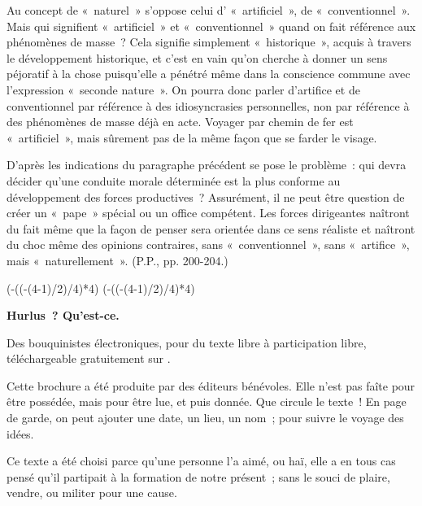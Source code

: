 \documentclass[french,twoside]{book} %
\newcommand{\dateline}[1]{\medskip{\RaggedLeft{#1}\par}\bigskip}
\newcommand\chapterclose{} %
\def\truncdiv#1#2{((#1-(#2-1)/2)/#2)}
\def\moduloop#1#2{(#1-\truncdiv{#1}{#2}*#2)}
\def\modulo#1#2{\number\numexpr\moduloop{#1}{#2}\relax}
\begin{document}
Au concept de « naturel » s’oppose celui d’ « artificiel », de « conventionnel ». Mais qui signifient « artificiel » et « conventionnel » quand on fait référence aux phénomènes de masse ? Cela signifie simplement « historique », acquis à travers le développement historique, et c’est en vain qu’on cherche à donner un sens péjoratif à la chose puisqu’elle a pénétré même dans la conscience commune avec l’expression « seconde nature ». On pourra donc parler d’artifice et de conventionnel par référence à des idiosyncrasies personnelles, non par référence à des phénomènes de masse déjà en acte. Voyager par chemin de fer est « artificiel », mais sûrement pas de la même façon que se farder le visage.\par
 D'après les indications du paragraphe précédent se pose le problème : qui devra décider qu’une conduite morale déterminée est la plus conforme au développement des forces productives ? Assurément, il ne peut être question de créer un « pape » spécial ou un office compétent. Les forces dirigeantes naîtront du fait même que la façon de penser sera orientée dans ce sens réaliste et naîtront du choc même des opinions contraires, sans « conventionnel », sans « artifice », mais « naturellement ». (P.P., pp. 200-204.)\par

\dateline{[1933-1934]}
\chapterclose

 


\ifbooklet
  \pagestyle{empty}
  \clearpage
  \ifnum\modulo{\value{page}}{4}=0 \hbox{}\newpage\hbox{}\newpage\fi
  \ifnum\modulo{\value{page}}{4}=1 \hbox{}\newpage\hbox{}\newpage\fi


  \hbox{}\newpage
  \ifodd\value{page}\hbox{}\newpage\fi
  {\centering\color{rubric}\bfseries\noindent\large
    Hurlus ? Qu’est-ce.\par
    \bigskip
  }
  \noindent Des bouquinistes électroniques, pour du texte libre à participation libre,
  téléchargeable gratuitement sur \href{https://hurlus.fr}{}.\par
  \bigskip
  \noindent Cette brochure a été produite par des éditeurs bénévoles.
  Elle n’est pas faîte pour être possédée, mais pour être lue, et puis donnée.
  Que circule le texte !
  En page de garde, on peut ajouter une date, un lieu, un nom ; pour suivre le voyage des idées.
  \par

  Ce texte a été choisi parce qu’une personne l’a aimé,
  ou haï, elle a en tous cas pensé qu’il partipait à la formation de notre présent ;
  sans le souci de plaire, vendre, ou militer pour une cause.
  \par
\end{document}
